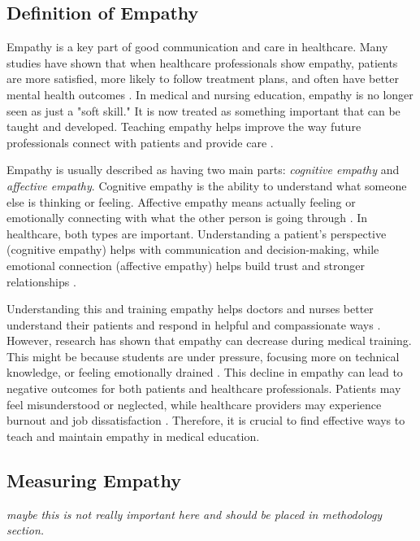\subsection{Definition of Empathy}
Empathy is a key part of good communication and care in healthcare. Many studies have shown that when healthcare professionals show empathy, patients are more satisfied, more likely to follow treatment plans, and often have better mental health outcomes \cite{Cunico2012, Olson1995, Ozcan2018}. In medical and nursing education, empathy is no longer seen as just a "soft skill." It is now treated as something important that can be taught and developed. Teaching empathy helps improve the way future professionals connect with patients and provide care \cite{Cunico2012}.

Empathy is usually described as having two main parts: \textit{cognitive empathy} and \textit{affective empathy}. Cognitive empathy is the ability to understand what someone else is thinking or feeling. Affective empathy means actually feeling or emotionally connecting with what the other person is going through \cite{Ventura2020, Martingano2021}. In healthcare, both types are important. Understanding a patient's perspective (cognitive empathy) helps with communication and decision-making, while emotional connection (affective empathy) helps build trust and stronger relationships \cite{Cunico2012, Ozcan2018}. 

Understanding this and training empathy helps doctors and nurses better understand their patients and respond in helpful and compassionate ways \cite{Ozcan2018, Olson1995}. However, research has shown that empathy can decrease during medical training. This might be because students are under pressure, focusing more on technical knowledge, or feeling emotionally drained \cite{Mattsson2024, Ozcan2018}. This decline in empathy can lead to negative outcomes for both patients and healthcare professionals. Patients may feel misunderstood or neglected, while healthcare providers may experience burnout and job dissatisfaction \cite{Mattsson2024, Cunico2012}. Therefore, it is crucial to find effective ways to teach and maintain empathy in medical education.

\subsection{Measuring Empathy}
\emph{maybe this is not really important here and should be placed in methodology section.}

